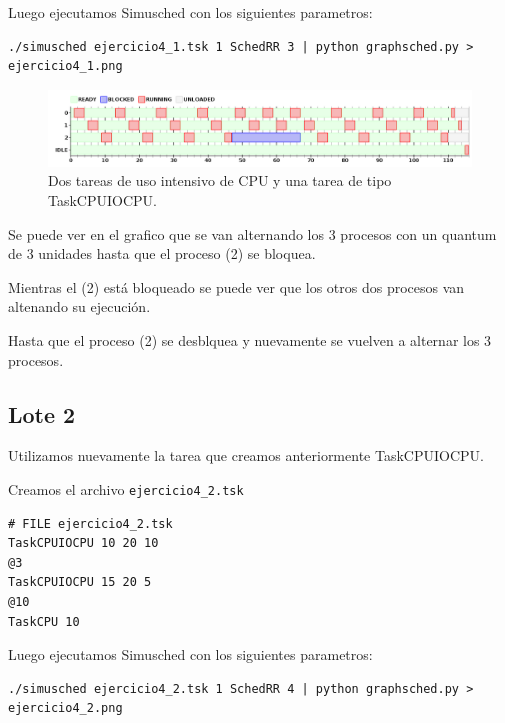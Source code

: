 Luego ejecutamos Simusched con los siguientes parametros:

\begin{framed}
\begin{verbatim}
./simusched ejercicio4_1.tsk 1 SchedRR 3 | python graphsched.py > ejercicio4_1.png
\end{verbatim}
\end{framed}

\begin{figure}[h!]
  \caption{Dos tareas de uso intensivo de CPU y una tarea de tipo TaskCPUIOCPU.}
  \centering
    \includegraphics[width=1\textwidth]{img/ejercicio4_1.png}
\end{figure}

Se puede ver en el grafico que se van alternando los 3 procesos con un quantum de 3 unidades hasta que el proceso (2) se bloquea.

Mientras el (2) est\'a bloqueado se puede ver que los otros dos procesos van altenando su ejecuci\'on. 

Hasta que el proceso (2) se desblquea y nuevamente se vuelven a alternar los 3 procesos.

\subsection{Lote 2}

Utilizamos nuevamente la tarea que creamos anteriormente TaskCPUIOCPU.

Creamos el archivo \verb|ejercicio4_2.tsk|

\begin{framed}
\begin{verbatim}
# FILE ejercicio4_2.tsk
TaskCPUIOCPU 10 20 10
@3
TaskCPUIOCPU 15 20 5
@10
TaskCPU 10
\end{verbatim}
\end{framed}

Luego ejecutamos Simusched con los siguientes parametros:

\begin{framed}
\begin{verbatim}
./simusched ejercicio4_2.tsk 1 SchedRR 4 | python graphsched.py > ejercicio4_2.png
\end{verbatim}
\end{framed}

